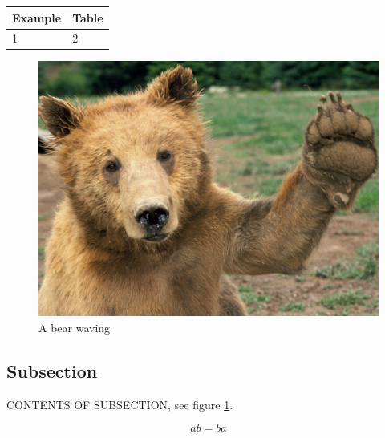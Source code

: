 \documentclass[11pt]{article} %
\begin{document}
	\begin{table}[h]
		\label{table:example}
		\begin{tabular}{|l|l|} \hline
			
			Example&
			Table \\ \hline
			
			1&
			2 \\ \hline
			
		\end{tabular}
	\end{table}
		\begin{figure}[!htbp] %
			\centering
			\includegraphics[scale=0.1]{example_pic} %
			\caption{A bear waving}
			\label{fig:example}
		\end{figure}
		
	\subsection{Subsection}
	
	CONTENTS OF SUBSECTION, see figure \ref{fig:example}.
	
	\begin{equation}
		\label{eq:example}
		ab = ba	%
	\end{equation}
	
\end{document}
